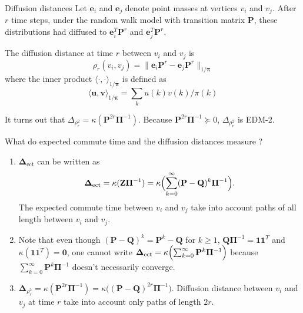 \documentclass[professionalfonts,hyperref={pdfpagelabels=false,colorlinks=true,linkcolor=red}]{beamer}
\begin{document}
\begin{frame}{Diffusion distances}
  Let $\bm{e}_i$ and $\bm{e}_j$ denote point masses at vertices $v_i$ and
  $v_j$. After $r$ time steps, under the random walk model with
  transition matrix $\mathbf{P}$, these distributions had diffused to
  $\bm{e}_i^{T} \mathbf{P}^{r}$ and $\bm{e}_j^{T}\mathbf{P}^{r}$. 
  
  \vskip10pt The diffusion distance \cite{coifman06:_diffus_maps} at
  time $r$ between $v_i$ and $v_j$ is
    \begin{equation*}
      \rho_{r}(v_i,v_j) = \| \bm{e}_i \mathbf{P}^{r} - \bm{e}_j
      \mathbf{P}^{r} \|_{1/\bm{\pi}}
    \end{equation*}
    where the inner product $\langle \cdot, \cdot
    \rangle_{1/\bm{\pi}}$ is defined as
    \begin{equation*}
      \langle \bm{u}, \bm{v} \rangle_{1/\bm{\pi}} = \sum_{k} u(k)
      v(k)/\pi(k)
    \end{equation*}
    
      \vskip10pt
      It turns out that $\Delta_{\rho_{r}^{2}} =
      \kappa(\mathbf{P}^{2r}\bm{\Pi}^{-1})$. 
      Because $\mathbf{P}^{2r}\bm{\Pi}^{-1} \succeq 0$,
      $\Delta_{\rho_{r}^{2}}$ is EDM-2.  
\end{frame}

\begin{frame}
  What do expected commute time and the diffusion distances
    measure ?
  \begin{enumerate}
  \item $\bm{\Delta}_{\mathrm{ect}}$ can be written as
    \begin{equation*}
      \bm{\Delta}_{\mathrm{ect}} = \kappa(\mathbf{Z}\bm{\Pi}^{-1}) =
      \kappa\Bigl( \sum_{k=0}^{\infty}(\mathbf{P} -
      \mathbf{Q})^{k}\bm{\Pi}^{-1}\Bigr).
    \end{equation*}
    The expected commute time between $v_i$ and $v_j$ take into account
    paths of all length between $v_i$ and $v_j$.
  \item Note that even though $(\mathbf{P} - \mathbf{Q})^{k} =
    \mathbf{P}^{k} - \mathbf{Q}$ for $k \geq 1$,
    $\mathbf{Q}\bm{\Pi}^{-1} = \bm{1}\bm{1}^{T}$ and
    $\kappa(\bm{1}\bm{1}^{T}) = \bm{0}$, one cannot write
    $\bm{\Delta}_{\mathrm{ect}} =
    \kappa\Bigl(\sum_{k=0}^{\infty}\mathbf{P}^{k}\bm{\Pi}^{-1}\Bigr)$
    because $\sum_{k=0}^{\infty}\mathbf{P}^{k}\bm{\Pi}^{-1}$
    doesn't necessarily converge.
  \item $\bm{\Delta}_{\rho_{r}^{2}} =
    \kappa(\mathbf{P}^{2r}\bm{\Pi}^{-1}) = \kappa\bigl((\mathbf{P} -
    \mathbf{Q})^{2r}\bm{\Pi}^{-1}\bigr)$. Diffusion distance between
    $v_i$ and $v_j$ at time $r$ take into account only paths of length
    $2r$.
  \end{enumerate}
\end{frame}
\end{document}

